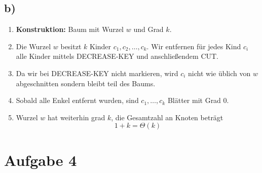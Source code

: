 \documentclass[a4paper]{scrartcl}
\begin{document}
\subsection*{b)}

\begin{enumerate}
    \item \textbf{Konstruktion:} Baum mit Wurzel $w$ und Grad $k$.
    \item Die Wurzel $w$ besitzt $k$ Kinder $c_1, c_2, \dots, c_k$. Wir entfernen für jedes Kind $c_i$ alle Kinder mittels DECREASE-KEY und anschließendem CUT.
    \item Da wir bei DECREASE-KEY nicht markieren, wird $c_i$ nicht wie üblich von $w$ abgeschnitten sondern bleibt teil des Baums.
    \item Sobald alle Enkel entfernt wurden, sind $c_1, \dots, c_k$ Blätter mit Grad 0.
    \item Wurzel $w$ hat weiterhin grad $k$, die Gesamtzahl an Knoten beträgt
    $$1 + k = \Theta(k)$$
\end{enumerate}
\section*{Aufgabe 4}


\end{document}
